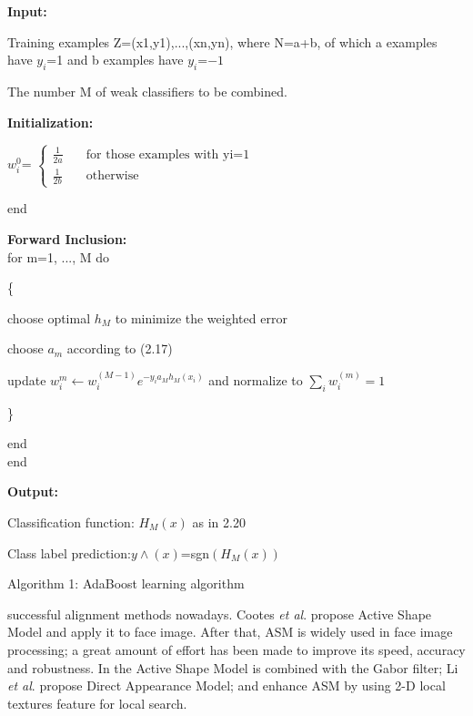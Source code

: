\documentclass[12pt]{report}
\begin{document}
\textbf{Input:} \\
\par Training examples Z={(x1,y1),...,(xn,yn)}, where N=a+b, of which a examples have $y_i$=1 and b examples have $y_i$=$-1$ \\
\par The number M of weak classifiers to be combined.

\textbf{Initialization:} \\
\par $w_i^{0}$=
$\begin{cases}
	\frac{1}{2a}  & \quad \text{for those examples with yi=1} \\
	\frac{1}{2b}  & \quad \text{otherwise}
\end{cases}$ \\
\par end

\textbf{Forward Inclusion:} \\

 for m=1, ..., M do \\
\par \{
\par choose optimal $h_M$ to minimize the weighted error \\
\par choose $a_m$ according to (2.17) \\
\par update $w_i^{m} \leftarrow w_i^{(M-1)}e^{-y_ia_Mh_M(x_i)}$ and normalize to $\displaystyle\sum_{i}w_i^{(m)}=1$  \\
\par \}
\par end \\
 end \\
 \par 
\textbf{Output:} \\
\par Classification function: $H_M(x)$ as in 2.20 \\
\par Class label prediction:$y\land(x)$=sgn$(H_M(x))$

\begin{center}
	Algorithm 1: AdaBoost learning algorithm \cite{35}
	
\end{center}

successful alignment methods nowadays. Cootes \textit{ et al}. \cite{18} \cite{45} \cite{16} propose Active Shape Model and apply it to face image. After that, ASM is widely used in face image processing; a great amount of effort has been made to improve its speed, accuracy and robustness. In \cite{36} the Active Shape Model is combined with the Gabor filter; Li \textit{ et al}. \cite{78} propose Direct Appearance Model; \cite{56} and \cite{101} enhance ASM by using 2-D local textures feature for local search. 
\end{document}
